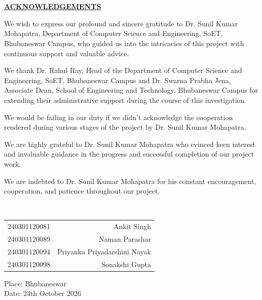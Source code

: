 \documentclass{article}
\begin{document}
\vfill
\newpage
\section*{} %
\begin{center}
\underline{\LARGE \textbf{ACKNOWLEDGEMENTS}}\\[1.5cm]
\end{center}
\large{We wish to express our profound and sincere gratitude to Dr. Sunil Kumar Mohapatra, Department of Computer Science and Engineering, SoET, Bhubaneswar Campus, who guided us into the intricacies of this project with continuous support and valuable advice.\par
We thank Dr. Rahul Ray, Head of the Department of Computer Science and Engineering, SoET, Bhubaneswar Campus and Dr. Swarna Prabha Jena, Associate Dean, School of Engineering and Technology, Bhubaneswar Campus for extending
their administrative support during the course of this investigation. \par
We would be failing in our duty if we didn’t acknowledge the cooperation rendered during various stages of the project by
Dr. Sunil Kumar Mohapatra. \par
We are highly grateful to Dr. Sunil Kumar Mohapatra who evinced keen interest and invaluable
guidance in the progress and successful completion of our project work. \par
We are indebted to Dr. Sunil Kumar Mohapatra for his constant encouragement, cooperation, and patience throughout our project.}\\[0.5cm]
\begin{flushright}
\begin{table}[h]
\begin{tabular}{lr}
240301120081 & Ankit Singh \\ 
240301120089 & Naman Parashar \\
240301120094 & Priyanka Priyadarshini Nayak \\
240301120098 & Sonakshi Gupta \\
\end{tabular}
\end{table}
\end{flushright}

\begin{flushleft}
Place: Bhubaneswar\\
Date: 24th October 2026
\end{flushleft}
\end{document}
